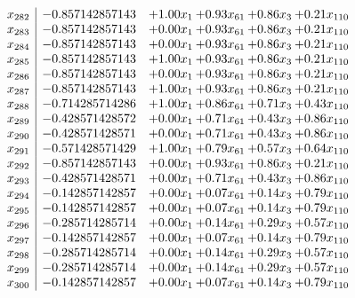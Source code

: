 \documentclass[8pt]{article}
\begin{document}
\[\begin{array}{c| c c@{\hskip 2pt} c@{\hskip 2pt} c@{\hskip 2pt} c@{\hskip 2pt} }
 x_{282}   &  -0.857142857143 & +  1.00 x_{1} & +  0.93 x_{61} & +  0.86 x_{3} & +  0.21 x_{110}\\
 x_{283}   &  -0.857142857143 & +  0.00 x_{1} & +  0.93 x_{61} & +  0.86 x_{3} & +  0.21 x_{110}\\
 x_{284}   &  -0.857142857143 & +  0.00 x_{1} & +  0.93 x_{61} & +  0.86 x_{3} & +  0.21 x_{110}\\
 x_{285}   &  -0.857142857143 & +  1.00 x_{1} & +  0.93 x_{61} & +  0.86 x_{3} & +  0.21 x_{110}\\
 x_{286}   &  -0.857142857143 & +  0.00 x_{1} & +  0.93 x_{61} & +  0.86 x_{3} & +  0.21 x_{110}\\
 x_{287}   &  -0.857142857143 & +  1.00 x_{1} & +  0.93 x_{61} & +  0.86 x_{3} & +  0.21 x_{110}\\
 x_{288}   &  -0.714285714286 & +  1.00 x_{1} & +  0.86 x_{61} & +  0.71 x_{3} & +  0.43 x_{110}\\
 x_{289}   &  -0.428571428572 & +  0.00 x_{1} & +  0.71 x_{61} & +  0.43 x_{3} & +  0.86 x_{110}\\
 x_{290}   &  -0.428571428571 & +  0.00 x_{1} & +  0.71 x_{61} & +  0.43 x_{3} & +  0.86 x_{110}\\
 x_{291}   &  -0.571428571429 & +  1.00 x_{1} & +  0.79 x_{61} & +  0.57 x_{3} & +  0.64 x_{110}\\
 x_{292}   &  -0.857142857143 & +  0.00 x_{1} & +  0.93 x_{61} & +  0.86 x_{3} & +  0.21 x_{110}\\
 x_{293}   &  -0.428571428571 & +  0.00 x_{1} & +  0.71 x_{61} & +  0.43 x_{3} & +  0.86 x_{110}\\
 x_{294}   &  -0.142857142857 & +  0.00 x_{1} & +  0.07 x_{61} & +  0.14 x_{3} & +  0.79 x_{110}\\
 x_{295}   &  -0.142857142857 & +  0.00 x_{1} & +  0.07 x_{61} & +  0.14 x_{3} & +  0.79 x_{110}\\
 x_{296}   &  -0.285714285714 & +  0.00 x_{1} & +  0.14 x_{61} & +  0.29 x_{3} & +  0.57 x_{110}\\
 x_{297}   &  -0.142857142857 & +  0.00 x_{1} & +  0.07 x_{61} & +  0.14 x_{3} & +  0.79 x_{110}\\
 x_{298}   &  -0.285714285714 & +  0.00 x_{1} & +  0.14 x_{61} & +  0.29 x_{3} & +  0.57 x_{110}\\
 x_{299}   &  -0.285714285714 & +  0.00 x_{1} & +  0.14 x_{61} & +  0.29 x_{3} & +  0.57 x_{110}\\
 x_{300}   &  -0.142857142857 & +  0.00 x_{1} & +  0.07 x_{61} & +  0.14 x_{3} & +  0.79 x_{110}\\

\end{array}\]
\end{document}
